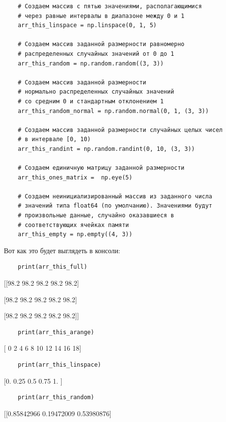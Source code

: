 \documentclass[pract]{SCWorks}
\begin{document}
\begin{itemize}
\begin{verbatim}
    # Создаем массив с пятью значениями, располагающимися
    # через равные интервалы в диапазоне между 0 и 1
    arr_this_linspace = np.linspace(0, 1, 5)

    # Создаем массив заданной размерности равномерно
    # распределенных случайных значений от 0 до 1
    arr_this_random = np.random.random((3, 3))

    # Создаем массив заданной размерности
    # нормально распределенных случайных значений
    # со средним 0 и стандартным отклонением 1
    arr_this_random_normal = np.random.normal(0, 1, (3, 3))

    # Создаем массив заданной размерности случайных целых чисел
    # в интервале [0, 10)
    arr_this_randint = np.random.randint(0, 10, (3, 3))

    # Создаем единичную матрицу заданной размерности
    arr_this_ones_matrix =  np.eye(5)

    # Создаем неинициализированный массив из заданного числа
    # значений типа float64 (по умолчанию). Значениями будут 
    # произвольные данные, случайно оказавшиеся в 
    # соответствующих ячейках памяти
    arr_this_empty = np.empty((4, 3))
    \end{verbatim}

    Вот как это будет выглядеть в консоли:

    \begin{verbatim}
    print(arr_this_full)
    \end{verbatim}

    [[98.2 98.2 98.2 98.2 98.2]
    
    [98.2 98.2 98.2 98.2 98.2]
    
    [98.2 98.2 98.2 98.2 98.2]]

    \begin{verbatim}
    print(arr_this_arange)
    \end{verbatim}

    [ 0  2  4  6  8 10 12 14 16 18]

    \begin{verbatim}
    print(arr_this_linspace)
    \end{verbatim}

    [0.   0.25 0.5  0.75 1.  ]

    \begin{verbatim}
    print(arr_this_random)
    \end{verbatim}

    [[0.85842966 0.19472009 0.53980876]
    

\end{itemize}
\end{document}
